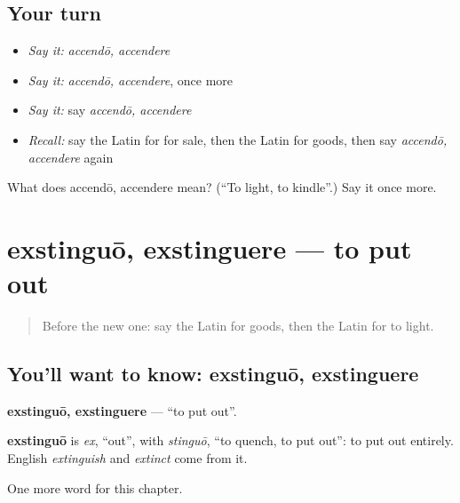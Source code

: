 \subsection*{Your turn}
\begin{itemize}
\raggedright
  \item \emph{Say it:} \emph{accendō, accendere}
  \item \emph{Say it:} \emph{accendō, accendere}, once more
  \item \emph{Say it:} say \emph{accendō, accendere}
  \item \emph{Recall:} say the Latin for for sale, then the Latin for goods, then say \emph{accendō, accendere} again
\end{itemize}

\begin{tcolorbox}[breakable,colback=teal!4,colframe=teal!35!black,title={Before you move on}]
What does accendō, accendere mean? (\textquotedblleft{}To light, to kindle\textquotedblright{}.) Say it once more.
\end{tcolorbox}
\section[exstinguō, exstinguere]{exstinguō, exstinguere — to put out}

\label{lesson:LA-C165-exstinguo}



\begin{quote}
Before the new one: say the Latin for goods, then the Latin for to light.
\end{quote}

\subsection*{You'll want to know: exstinguō, exstinguere}
\textbf{exstinguō, exstinguere} — \textquotedblleft{}to put out\textquotedblright{}.

\begin{cousinweb}
\textbf{exstinguō} is \emph{ex}, \textquotedblleft{}out\textquotedblright{}, with \emph{stinguō}, \textquotedblleft{}to quench, to put out\textquotedblright{}: to put out entirely. English \emph{extinguish} and \emph{extinct} come from it.
\end{cousinweb}

\begin{grammarlens}[title={What you've built}]
One more word for this chapter.
\end{grammarlens}

